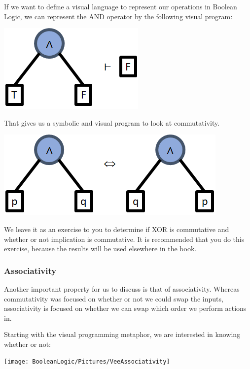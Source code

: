 If we want to define a visual language to represent our operations in Boolean Logic, we can represent the AND operator by the following visual program:
\begin{center}
\includegraphics{02_LogicConstructions/Pictures/WedgeEntailment.png}
\end{center}

That gives us a symbolic and visual program to look at commutativity.

\begin{center}
    \includegraphics{02_LogicConstructions/Pictures/WedgeCommutativity.png}
\end{center}

\begin{exercise}
We leave it as an exercise to you to determine if XOR is commutative and whether or not implication is commutative. It is recommended that you do this exercise, because the results will be used elsewhere in the book.
\end{exercise}

\subsubsection{Associativity}
Another important property for us to discuss is that of associativity. Whereas commutativity was focused on whether or not we could swap the inputs, associativity is focused on whether we can swap which order we perform actions in.
\begin{samepage}
Starting with the visual programming metaphor, we are interested in knowing whether or not:

\begin{center}
    \texttt{[image: BooleanLogic/Pictures/VeeAssociativity]}
\end{center}
\end{samepage}

